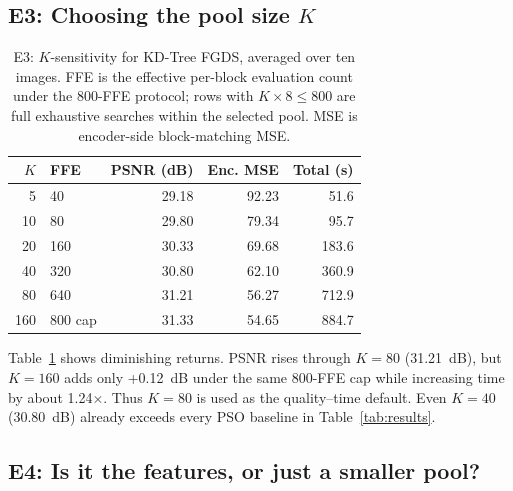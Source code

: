 \documentclass[conference, a4paper]{IEEEtran}
\begin{document}
\subsection{E3: Choosing the pool size \mbox{$K$}}

\begin{table}[t]
    \centering
    \caption{E3: \mbox{$K$}-sensitivity for KD-Tree FGDS, averaged over ten images. FFE is the effective per-block evaluation count under the 800-FFE protocol; rows with \mbox{$K\!\times\!8\le800$} are full exhaustive searches within the selected pool. MSE is encoder-side block-matching MSE.}
    \label{tab:k_sensitivity}
    \begin{tabular}{rlrrr}
        \toprule
        \mbox{$K$} & \textbf{FFE} & \textbf{PSNR (dB)} & \textbf{Enc. MSE} & \textbf{Total (s)} \\
        \midrule
        5          & 40           & 29.18              & 92.23             & 51.6               \\
        10         & 80           & 29.80              & 79.34             & 95.7               \\
        20         & 160          & 30.33              & 69.68             & 183.6              \\
        40         & 320          & 30.80              & 62.10             & 360.9              \\
        80         & 640          & 31.21              & 56.27             & 712.9              \\
        160        & 800 cap      & 31.33              & 54.65             & 884.7              \\
        \bottomrule
    \end{tabular}
\end{table}

Table~\ref{tab:k_sensitivity} shows diminishing returns. PSNR rises through \mbox{$K\!=\!80$} (31.21~dB), but \mbox{$K\!=\!160$} adds only +0.12~dB under the same 800-FFE cap while increasing time by about 1.24\mbox{$\times$}. Thus \mbox{$K=80$} is used as the quality--time default. Even \mbox{$K\!=\!40$} (30.80~dB) already exceeds every PSO baseline in Table~\ref{tab:results}.

\subsection{E4: Is it the features, or just a smaller pool?}
\end{document}
